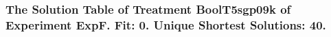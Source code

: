  \begin{frame}
 \fontsize{8pt}{9pt}\selectfont
 \frametitle{ The Solution Table of Treatment BoolT5sgp09k of Experiment ExpF. Fit: 0. Unique Shortest Solutions: 40. }

 \label{ExpFSolutionTable007.tex}  
 \end{frame}

